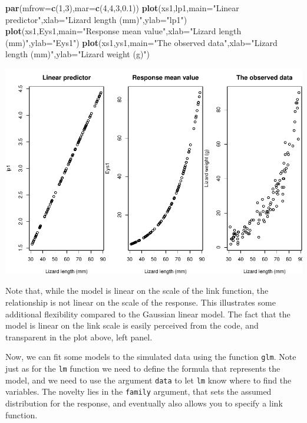 \documentclass[
]{book}
\newenvironment{Shaded}{\begin{snugshade}}{\end{snugshade}}
\newcommand{\AttributeTok}[1]{\textcolor[rgb]{0.13,0.29,0.53}{#1}}
\newcommand{\DecValTok}[1]{\textcolor[rgb]{0.00,0.00,0.81}{#1}}
\newcommand{\FloatTok}[1]{\textcolor[rgb]{0.00,0.00,0.81}{#1}}
\newcommand{\FunctionTok}[1]{\textcolor[rgb]{0.13,0.29,0.53}{\textbf{#1}}}
\newcommand{\NormalTok}[1]{#1}
\newcommand{\StringTok}[1]{\textcolor[rgb]{0.31,0.60,0.02}{#1}}
\begin{document}
\begin{Shaded}
\begin{Highlighting}[]
\FunctionTok{par}\NormalTok{(}\AttributeTok{mfrow=}\FunctionTok{c}\NormalTok{(}\DecValTok{1}\NormalTok{,}\DecValTok{3}\NormalTok{),}\AttributeTok{mar=}\FunctionTok{c}\NormalTok{(}\DecValTok{4}\NormalTok{,}\DecValTok{4}\NormalTok{,}\DecValTok{3}\NormalTok{,}\FloatTok{0.1}\NormalTok{))}
\FunctionTok{plot}\NormalTok{(xs1,lp1,}\AttributeTok{main=}\StringTok{"Linear predictor"}\NormalTok{,}\AttributeTok{xlab=}\StringTok{"Lizard length (mm)"}\NormalTok{,}\AttributeTok{ylab=}\StringTok{"lp1"}\NormalTok{)}
\FunctionTok{plot}\NormalTok{(xs1,Eys1,}\AttributeTok{main=}\StringTok{"Response mean value"}\NormalTok{,}\AttributeTok{xlab=}\StringTok{"Lizard length (mm)"}\NormalTok{,}\AttributeTok{ylab=}\StringTok{"Eys1"}\NormalTok{)}
\FunctionTok{plot}\NormalTok{(xs1,ys1,}\AttributeTok{main=}\StringTok{"The observed data"}\NormalTok{,}\AttributeTok{xlab=}\StringTok{"Lizard length (mm)"}\NormalTok{,}\AttributeTok{ylab=}\StringTok{"Lizard weight (g)"}\NormalTok{)}
\end{Highlighting}
\end{Shaded}

\includegraphics{ECOMODbook_files/figure-latex/glm2-1.pdf}

Note that, while the model is linear on the scale of the link function, the relationship is not linear on the scale of the response. This illustrates some additional flexibility compared to the Gaussian linear model. The fact that the model is linear on the link scale is easily perceived from the code, and transparent in the plot above, left panel.

Now, we can fit some models to the simulated data using the function \texttt{glm}. Note just as for the \texttt{lm} function we need to define the formula that represents the model, and we need to use the argument \texttt{data} to let \texttt{lm} know where to find the variables. The novelty lies in the \texttt{family} argument, that sets the assumed distribution for the response, and eventually also allows you to specify a link function.
\end{document}
